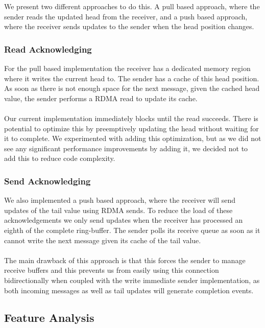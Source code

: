 We present two different approaches to do this. A pull based approach, where the sender reads the updated head from the
receiver, and a push based approach, where the receiver sends updates to the sender when the head position changes.

\subsubsection{Read Acknowledging}
For the pull based implementation the receiver has a dedicated memory region where it writes the current 
head to. The sender has a cache of this head position. As soon as there is not enough space for the next message, given 
the cached head value, the sender performs a RDMA read to update its cache.

\paragraph{} Our current implementation immediately blocks until the read succeeds. There is potential to optimize this by preemptively 
updating the head without waiting for it to complete. We experimented with adding this optimization, but as we did not see any significant 
performance improvements by adding it, we decided not to add this to reduce code complexity. 

\subsubsection{Send Acknowledging} 

We also implemented a push based approach, where the receiver will send updates of the tail value using 
RDMA sends. To reduce the load of these acknowledgements we only send updates when the receiver has processed an eighth of 
the complete ring-buffer. The sender polls its receive queue as soon as it cannot write the next message given its
cache of the tail value.

\paragraph{} The main drawback of this approach is that this forces the sender to manage receive buffers and this prevents
us from easily using this connection bidirectionally when coupled with the write immediate sender implementation, as both 
incoming messages as well as tail updates will generate completion events.

\subsection{Feature Analysis}

